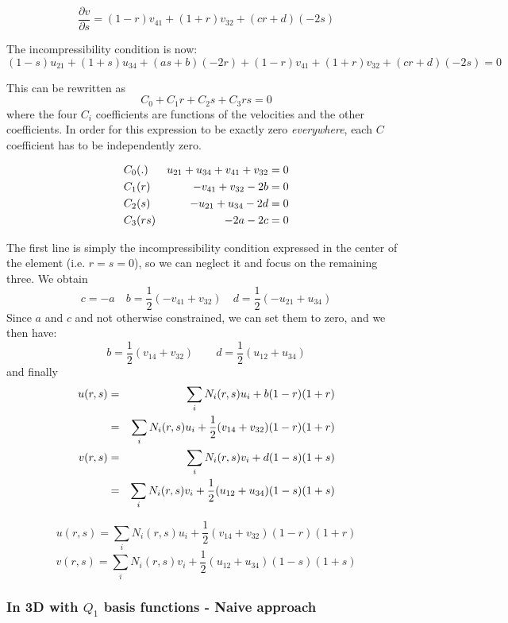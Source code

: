 \[
\frac{\partial v}{\partial s}=
(1-r) v_{41} + (1+r) v_{32}
+ (c r + d)(-2s)
\]


The incompressibility condition is now:
\[
(1-s) u_{21} + (1+s) u_{34} 
+ (a s + b) (-2r) +
(1-r) v_{41} + (1+r) v_{32}
+ (c r + d)(-2s)
=0
\]

This can be rewritten as
\[
C_0  + C_1 r + C_2 s + C_3 rs = 0
\]
where the four $C_i$ coefficients are functions of the velocities and the other coefficients.
In order for this expression to be exactly zero {\it everywhere}, each $C$ coefficient has
to be independently zero.

\begin{eqnarray}
C_0   &(.)  &  u_{21} + u_{34} + v_{41} + v_{32} =0\nonumber\\ 
C_1   &(r)  &  -v_{41} + v_{32} -2b =0\nonumber\\ 
C_2   &(s)  &  -u_{21} + u_{34} -2d =0 \nonumber\\ 
C_3   &(rs) &  -2a -2c =0\nonumber 
\end{eqnarray}

The first line is simply the incompressibility condition
expressed in the center of the element (i.e. $r=s=0$),
so we can neglect it and focus on the remaining three.
We obtain
\[
c=-a
\quad
b=\frac{1}{2}(-v_{41} + v_{32})
\quad
d=\frac{1}{2} (-u_{21} + u_{34})
\]
Since $a$ and $c$ and not otherwise constrained, we can set them to zero, and we then have:
\[
b=\frac{1}{2}(v_{14} + v_{32})
\quad\quad
d=\frac{1}{2} (u_{12} + u_{34})
\]
and finally
\begin{eqnarray}
u(r,s)
&=&\sum_i N_i(r,s) u_i + b(1-r)(1+r) \nonumber\\
&=&\sum_i N_i(r,s) u_i + \frac{1}{2}(v_{14} + v_{32})(1-r)(1+r) \nonumber\\
v(r,s)
&=&\sum_i N_i(r,s) v_i + d(1-s)(1+s) \nonumber\\
&=&\sum_i N_i(r,s) v_i + \frac{1}{2} (u_{12} + u_{34})(1-s)(1+s) \nonumber
\end{eqnarray}

\[
\boxed{
u(r,s)=\sum_i N_i(r,s) u_i + \frac{1}{2}(v_{14} + v_{32})(1-r)(1+r) 
}
\]
\[
\boxed{
v(r,s)
=\sum_i N_i(r,s) v_i + \frac{1}{2} (u_{12} + u_{34})(1-s)(1+s) 
}
\]


\subsubsection{In 3D with $Q_1$ basis functions - Naive approach}


